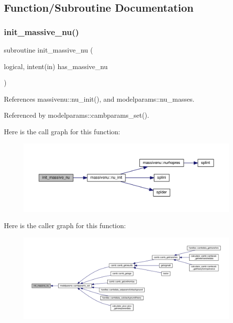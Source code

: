 \subsection{Function/\+Subroutine Documentation}
\mbox{\label{modules_8f90_aeb341c03133755d1152435fb5558adfb}} 
\subsubsection{\texorpdfstring{init\+\_\+massive\+\_\+nu()}{init\_massive\_nu()}}
{\footnotesize\ttfamily subroutine init\+\_\+massive\+\_\+nu (\begin{DoxyParamCaption}\item[{logical, intent(in)}]{has\+\_\+massive\+\_\+nu }\end{DoxyParamCaption})}



References massivenu\+::nu\+\_\+init(), and modelparams\+::nu\+\_\+masses.



Referenced by modelparams\+::cambparams\+\_\+set().

Here is the call graph for this function\+:
\nopagebreak
\begin{figure}[H]
\begin{center}
\leavevmode
\includegraphics[width=350pt]{modules_8f90_aeb341c03133755d1152435fb5558adfb_cgraph}
\end{center}
\end{figure}
Here is the caller graph for this function\+:
\nopagebreak
\begin{figure}[H]
\begin{center}
\leavevmode
\includegraphics[width=350pt]{modules_8f90_aeb341c03133755d1152435fb5558adfb_icgraph}
\end{center}
\end{figure}
